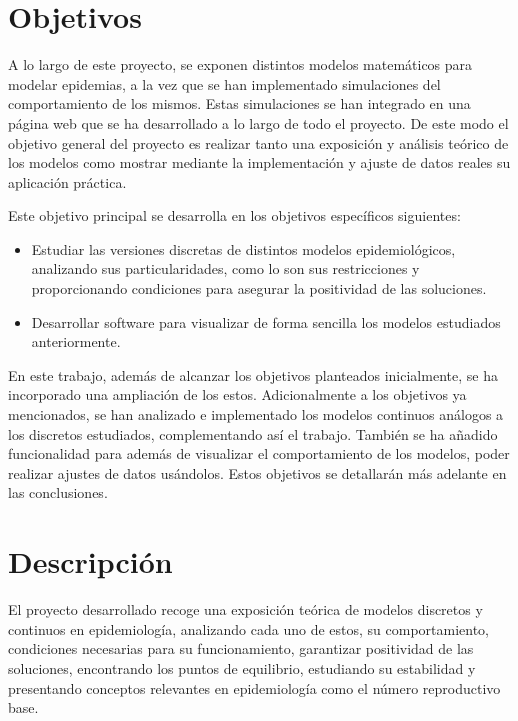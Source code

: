 \section*{Objetivos}

A lo largo de este proyecto, se exponen distintos modelos matemáticos para modelar epidemias, a la vez que se han implementado simulaciones del comportamiento de los mismos. Estas simulaciones se han integrado en una página web que se ha desarrollado a lo largo de todo el proyecto. De este modo el objetivo general del proyecto es realizar tanto una exposición y análisis teórico de los modelos como mostrar mediante la implementación y ajuste de datos reales su aplicación práctica.

Este objetivo principal se desarrolla en los objetivos específicos siguientes:

\begin{itemize}
\item Estudiar las versiones discretas de distintos modelos epidemiológicos, analizando sus particularidades, como lo son sus restricciones y proporcionando condiciones para asegurar la positividad de las soluciones.
\item Desarrollar software para visualizar de forma sencilla los modelos estudiados anteriormente.
\end{itemize}

En este trabajo, además de alcanzar los objetivos planteados inicialmente, se ha incorporado una ampliación de los estos. Adicionalmente a los objetivos ya mencionados, se han analizado e implementado los modelos continuos análogos a los discretos estudiados, complementando así el trabajo. También se ha añadido funcionalidad para además de visualizar el comportamiento de los modelos, poder realizar ajustes de datos usándolos. Estos objetivos se detallarán más adelante en las conclusiones.


\section*{Descripción}

El proyecto desarrollado recoge una exposición teórica de modelos discretos y continuos en epidemiología, analizando cada uno de estos, su comportamiento, condiciones necesarias para su funcionamiento, garantizar positividad de las soluciones, encontrando los puntos de equilibrio, estudiando su estabilidad y presentando conceptos relevantes en epidemiología como el número reproductivo base.

